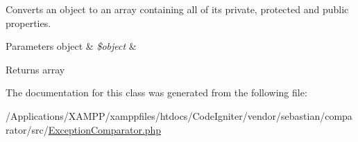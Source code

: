 Converts an object to an array containing all of its private, protected and public properties.


\begin{DoxyParams}[1]{Parameters}
object & {\em \$object} & \\
\hline
\end{DoxyParams}
\begin{DoxyReturn}{Returns}
array 
\end{DoxyReturn}


The documentation for this class was generated from the following file\+:\begin{DoxyCompactItemize}
\item 
/\+Applications/\+X\+A\+M\+P\+P/xamppfiles/htdocs/\+Code\+Igniter/vendor/sebastian/comparator/src/\mbox{\hyperlink{_exception_comparator_8php}{Exception\+Comparator.\+php}}\end{DoxyCompactItemize}

